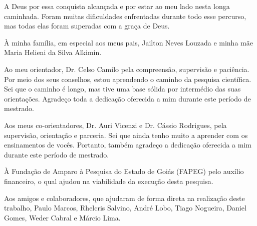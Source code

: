 \begin{agradecimentos}
A Deus por essa conquista alcançada e por estar ao meu lado nesta longa caminhada. Foram muitas dificuldades enfrentadas durante todo esse percurso, mas todas elas foram superadas com a graça de Deus.

À minha família, em especial aos meus pais, Jailton Neves Louzada e minha mãe Maria Helieni da Silva Alkimin.

Ao meu orientador, Dr. Celso Camilo pela compreensão, supervisão e paciência. Por meio dos seus conselhos, estou aprendendo o caminho da pesquisa científica. Sei que o caminho é longo, mas tive uma base sólida por intermédio das suas orientações. Agradeço toda a dedicação oferecida a mim durante este período de mestrado.

Aos meus co-orientadores, Dr. Auri Vicenzi e Dr. Cássio Rodrigues, pela supervisão, orientação e parceria. Sei que ainda tenho muito a aprender com os ensinamentos de vocês. Portanto, também agradeço a dedicação oferecida a mim durante este período de mestrado.

À Fundação de Amparo à Pesquisa do Estado de Goiás (FAPEG) pelo auxílio financeiro, o qual ajudou na viabilidade da execução desta pesquisa.

Aos amigos e colaboradores, que ajudaram de forma direta na realização deste trabalho, Paulo Marcos, Rhelcris Salvino, André Lobo, Tiago Nogueira, Daniel Gomes, Weder Cabral e Márcio Lima.

\end{agradecimentos}



